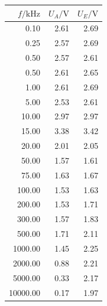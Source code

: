 \documentclass[]{scrartcl}
\begin{document}
\begin{table}[H]
	\centering
	\label{tab:ggverst_b}
	\hskip-1.50cm
	\begin{tabular}{r r r}
		\toprule
		$f / \si{\kilo\hertz}$ & $U_A/\si{\volt}$ & $U_E/\si{\volt}$ \\
		\midrule
		0.10	&	2.61	&	2.69 \\
		0.25	&	2.57	&	2.69 \\
		0.50	&	2.57	&	2.61 \\
		0.50	&	2.61	&	2.65 \\
		1.00	&	2.61	&	2.69 \\
		5.00	&	2.53	&	2.61 \\
		10.00	&	2.97	&	2.97 \\
		15.00	&	3.38	&	3.42 \\
		20.00	&	2.01	&	2.05 \\
		50.00	&	1.57	&	1.61 \\
		75.00	&	1.63	&	1.67 \\
		100.00	&	1.53	&	1.63 \\
		200.00	&	1.53	&	1.71 \\
		300.00	&	1.57	&	1.83 \\
		500.00	&	1.71	&	2.11 \\
		1000.00	&	1.45	&	2.25 \\
		2000.00	&	0.88	&	2.21 \\
		5000.00	&	0.33	&	2.17 \\
		10000.00	&	0.17	&	1.97 \\
		\bottomrule
	\end{tabular}
\end{table}
\end{document}
